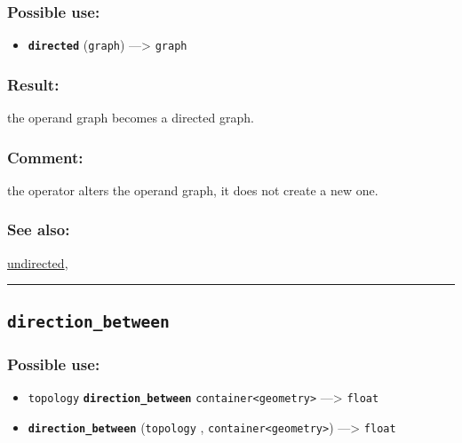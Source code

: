 \documentclass[]{book}
\providecommand{\tightlist}{%
  \setlength{\itemsep}{0pt}\setlength{\parskip}{0pt}}
\theoremstyle{definition}
\theoremstyle{definition}
\theoremstyle{definition}
\theoremstyle{remark}
\begin{document}
\subsubsection{Possible use:}\label{possible-use-132}

\begin{itemize}
\tightlist
\item
  \textbf{\texttt{directed}} (\texttt{graph}) ---\textgreater{}
  \texttt{graph}
\end{itemize}

\subsubsection{Result:}\label{result-128}

the operand graph becomes a directed graph.

\subsubsection{Comment:}\label{comment-30}

the operator alters the operand graph, it does not create a new one.

\subsubsection{See also:}\label{see-also-77}

\href{OperatorsSZ\#undirected}{undirected},

\begin{center}\rule{0.5\linewidth}{\linethickness}\end{center}

\subsection{\texorpdfstring{\texttt{direction\_between}}{direction\_between}}\label{direction_between}

\subsubsection{Possible use:}\label{possible-use-133}

\begin{itemize}
\tightlist
\item
  \texttt{topology} \textbf{\texttt{direction\_between}}
  \texttt{container\textless{}geometry\textgreater{}} ---\textgreater{}
  \texttt{float}
\item
  \textbf{\texttt{direction\_between}} (\texttt{topology} ,
  \texttt{container\textless{}geometry\textgreater{}}) ---\textgreater{}
  \texttt{float}
\end{itemize}
\end{document}
